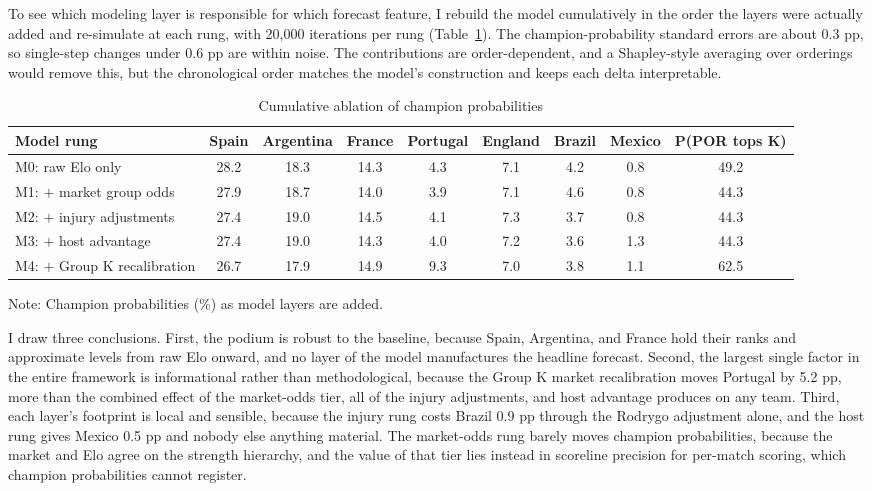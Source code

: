 \documentclass[11pt,letterpaper]{article}
\begin{document}
To see which modeling layer is responsible for which forecast feature, I rebuild the model cumulatively in the order the layers were actually added and re-simulate at each rung, with 20{,}000 iterations per rung (Table~\ref{tab:ablation}). The champion-probability standard errors are about 0.3 pp, so single-step changes under 0.6 pp are within noise. The contributions are order-dependent, and a Shapley-style averaging over orderings would remove this, but the chronological order matches the model's construction and keeps each delta interpretable.

\begin{table}[htpb!]
  \centering
  \caption{Cumulative ablation of champion probabilities}\label{tab:ablation}
  \begin{small}
  \begin{threeparttable}
    {\scriptsize\begin{tabular*}{\textwidth}{@{\extracolsep{\fill}} lcccccccc}
      \toprule
      Model rung & Spain & Argentina & France & Portugal & England & Brazil & Mexico & P(POR tops K) \\
      \midrule
      M0: raw Elo only          & 28.2 & 18.3 & 14.3 & 4.3 & 7.1 & 4.2 & 0.8 & 49.2 \\
      M1: $+$ market group odds & 27.9 & 18.7 & 14.0 & 3.9 & 7.1 & 4.6 & 0.8 & 44.3 \\
      M2: $+$ injury adjustments& 27.4 & 19.0 & 14.5 & 4.1 & 7.3 & 3.7 & 0.8 & 44.3 \\
      M3: $+$ host advantage    & 27.4 & 19.0 & 14.3 & 4.0 & 7.2 & 3.6 & 1.3 & 44.3 \\
      M4: $+$ Group K recalibration & 26.7 & 17.9 & 14.9 & 9.3 & 7.0 & 3.8 & 1.1 & 62.5 \\
      \bottomrule
    \end{tabular*}}
    \begin{tablenotes}\notesize
      \item Note: Champion probabilities (\%) as model layers are added.
    \end{tablenotes}
  \end{threeparttable}
  \end{small}
\end{table}

I draw three conclusions. First, the podium is robust to the baseline, because Spain, Argentina, and France hold their ranks and approximate levels from raw Elo onward, and no layer of the model manufactures the headline forecast. Second, the largest single factor in the entire framework is informational rather than methodological, because the Group K market recalibration moves Portugal by 5.2 pp, more than the combined effect of the market-odds tier, all of the injury adjustments, and host advantage produces on any team. Third, each layer's footprint is local and sensible, because the injury rung costs Brazil 0.9 pp through the Rodrygo adjustment alone, and the host rung gives Mexico 0.5 pp and nobody else anything material. The market-odds rung barely moves champion probabilities, because the market and Elo agree on the strength hierarchy, and the value of that tier lies instead in scoreline precision for per-match scoring, which champion probabilities cannot register.
\end{document}
